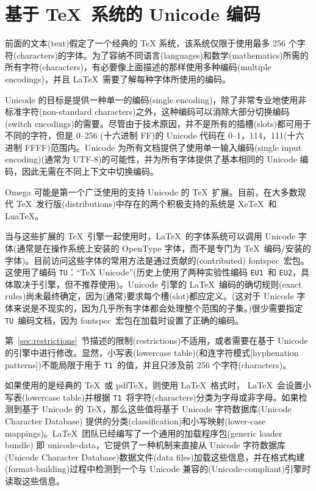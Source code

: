 \documentclass{ltxguide}[1994/11/20]
\providecommand{\Enc}[1]{\texttt{#1}}
\providecommand{\Pkg}[1]{%
  \textsf{#1}}
\begin{document}
\section{基于 \TeX\ 系统的 Unicode 编码}
\label{sec:unicode}

前面的文本(text)假定了一个经典的 TeX 系统，该系统仅限于使用最多 256 个字符(characters)的字体。为了容纳不同语言(languages)和数学(mathematics)所需的所有字符(characters)，有必要像上面描述的那样使用多种编码(multiple encodings)，并且 \LaTeX\ 需要了解每种字体所使用的编码。

Unicode 的目标是提供一种单一的编码(single encoding)，除了非常专业地使用非标准字符(non-standard characters)之外，这种编码可以消除大部分切换编码(switch encodings)的需要。尽管由于技术原因，并不是所有的插槽(slots)都可用于不同的字符，但是 0--256 (十六进制 FF)的 Unicode 代码在 0--1，114，111(十六进制 FFFF)范围内。Unicode 为所有文档提供了使用单一输入编码(single input encoding)(通常为 UTF-8)的可能性，并为所有字体提供了基本相同的 Unicode 编码，因此无需在不同上下文中切换编码。

Omega 可能是第一个广泛使用的支持 Unicode 的 \TeX\ 扩展。目前，在大多数现代 \TeX\ 发行版(distributions)中存在的两个积极支持的系统是 Xe\TeX\ 和 Lua\TeX。

当与这些扩展的 \TeX\ 引擎一起使用时，\LaTeX\ 的字体系统可以调用 Unicode 字体(通常是在操作系统上安装的 OpenType 字体，而不是专门为 \TeX\ 编码/安装的字体)。目前访问这些字体的常用方法是通过贡献的(contributed) \Pkg{fontspec}\ 宏包。这使用了编码 \Enc{TU}：“\TeX{} Unicode”(历史上使用了两种实验性编码 \Enc{EU1}\ 和 \Enc{EU2}，具体取决于引擎，但不推荐使用)。Unicode 引擎的 \LaTeX\ 编码的确切规则(exact rules)尚未最终确定，因为(通常)要求每个槽(slot)都应定义。(这对于 Unicode 字体来说是不现实的，因为几乎所有字体都会处理整个范围的子集。)很少需要指定 \Enc{TU}\ 编码文档，因为 \Pkg{fontspec}\ 宏包在加载时设置了正确的编码。

第~\ref{sec:restrictions}~节描述的限制(restrictions)不适用，或者需要在基于 Unicode 的引擎中进行修改。显然，小写表(lowercase table)(和连字符模式[hyphenation patterns])不能局限于用于 \Enc{T1}\ 的值，并且只涉及前 256 个字符(characters)。

如果使用的是经典的 \TeX\ 或 pdf\TeX，则使用 \LaTeX\ 格式时， \LaTeX\ 会设置小写表(lowercase table)并根据 \Enc{T1}\ 将字符(characters)分类为字母或非字母。如果检测到基于 Unicode 的 \TeX，那么这些值将基于 Unicode 字符数据库(Unicode Character Database) \cite{ucd} 提供的分类(classification)和小写映射(lower-case mappings)。\LaTeX{}\ 团队已经编写了一个通用的加载程序包(generic loader bundle) 即 \Pkg{unicode-data}，它提供了一种机制来直接从 Unicode 字符数据库(Unicode Character Database)数据文件(data files)加载这些信息，并在格式构建(format-building)过程中检测到一个与 Unicode 兼容的(Unicode-compliant)引擎时读取这些信息。
\end{document}
